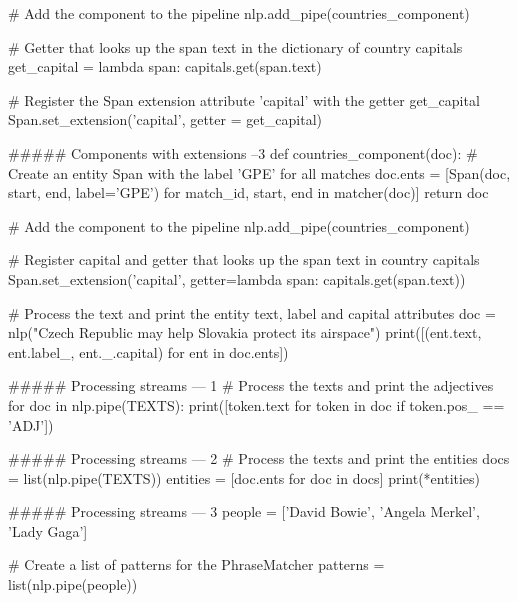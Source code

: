# Add the component to the pipeline
nlp.add_pipe(countries_component)

# Getter that looks up the span text in the dictionary of country capitals
get_capital = lambda span: capitals.get(span.text)

# Register the Span extension attribute 'capital' with the getter get_capital 
Span.set_extension('capital', getter = get_capital)

##### Components with extensions --3
def countries_component(doc):
    # Create an entity Span with the label 'GPE' for all matches
    doc.ents = [Span(doc, start, end, label='GPE')
                for match_id, start, end in matcher(doc)]
    return doc

# Add the component to the pipeline
nlp.add_pipe(countries_component)

# Register capital and getter that looks up the span text in country capitals
Span.set_extension('capital', getter=lambda span: capitals.get(span.text))

# Process the text and print the entity text, label and capital attributes
doc = nlp("Czech Republic may help Slovakia protect its airspace")
print([(ent.text, ent.label_, ent._.capital) for ent in doc.ents])

##### Processing streams --- 1
# Process the texts and print the adjectives
for doc in nlp.pipe(TEXTS):
    print([token.text for token in doc if token.pos_ == 'ADJ'])


##### Processing streams --- 2
# Process the texts and print the entities
docs = list(nlp.pipe(TEXTS))
entities = [doc.ents for doc in docs]
print(*entities)

##### Processing streams --- 3
people = ['David Bowie', 'Angela Merkel', 'Lady Gaga']

# Create a list of patterns for the PhraseMatcher
patterns = list(nlp.pipe(people))

